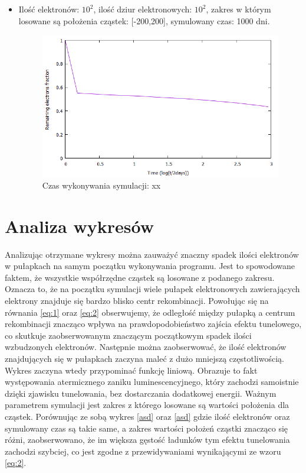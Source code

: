 \begin{itemize}
\item Ilość elektronów: $10^{2}$, ilość dziur elektronowych: $10^{2}$, zakres w którym losowane są położenia cząstek: [-200,200], symulowany czas: 1000 dni.
\begin{figure}[H]
\centering
\includegraphics[width=17cm]{wykres2}
\caption{ Czas wykonywania symulacji: xx}
\label{fig:Tunelowanie}
\end{figure}




\end{itemize}
\section{Analiza wykresów}
Analizując otrzymane wykresy można zauważyć znaczny spadek ilości elektronów w pułapkach na samym początku wykonywania programu. Jest to spowodowane faktem, że wszystkie współrzędne cząstek są losowane z podanego zakresu. Oznacza to, że na początku symulacji wiele pułapek elektronowych zawierających elektrony znajduje się bardzo blisko centr rekombinacji. Powołując się na równania \ref{eq:1} oraz \ref{eq:2} obserwujemy, że odległość między pułapką a centrum rekombinacji znacząco wpływa na prawdopodobieństwo zajścia efektu tunelowego, co skutkuje zaobserwowanym znaczącym początkowym spadek ilości wzbudzonych elektronów. Następnie można zaobserwować, że ilość elektronów znajdujących się w pułapkach zaczyna maleć z dużo mniejszą częstotliwością. Wykres zaczyna wtedy przypominać funkcję liniową. Obrazuje to fakt występowania atermicznego zaniku luminescencyjnego, który zachodzi samoistnie dzięki zjawisku tunelowania, bez dostarczania dodatkowej energii. 
Ważnym parametrem symulacji jest zakres z którego losowane są wartości położenia dla cząstek. Porównując ze sobą wykres \ref{asd} oraz \ref{asd} gdzie ilość elektronów oraz symulowany czas są takie same, a zakres wartości położeń cząstki znacząco się różni, zaobserwowano, że im większa gęstość ładunków tym efektu tunelowania zachodzi szybciej, co jest zgodne z przewidywaniami wynikającymi ze wzoru \ref{eq:2}.
